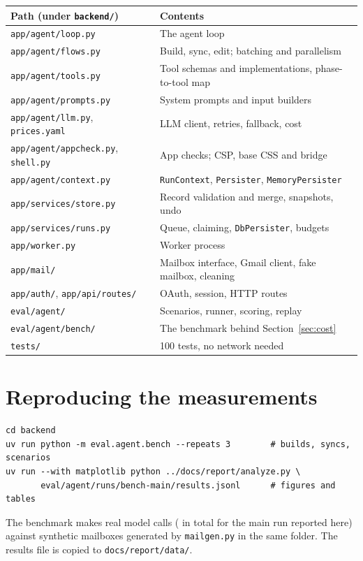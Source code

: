 \documentclass[10pt,a4paper]{article}
\newcommand{\code}[1]{\texttt{\small #1}}
\newcommand{\file}[1]{\texttt{\small #1}}
\begin{document}
\begin{center}\small
\begin{tabularx}{\linewidth}{@{}P{5.6cm}L@{}}
\toprule
\textbf{Path (under \code{backend/})} & \textbf{Contents} \\
\midrule
\file{app/agent/loop.py} & The agent loop \\
\file{app/agent/flows.py} & Build, sync, edit; batching and parallelism \\
\file{app/agent/tools.py} & Tool schemas and implementations, phase-to-tool map \\
\file{app/agent/prompts.py} & System prompts and input builders \\
\file{app/agent/llm.py}, \file{prices.yaml} & LLM client, retries, fallback, cost \\
\file{app/agent/appcheck.py}, \file{shell.py} & App checks; CSP, base CSS and bridge \\
\file{app/agent/context.py} & \code{RunContext}, \code{Persister}, \code{MemoryPersister} \\
\file{app/services/store.py} & Record validation and merge, snapshots, undo \\
\file{app/services/runs.py} & Queue, claiming, \code{DbPersister}, budgets \\
\file{app/worker.py} & Worker process \\
\file{app/mail/} & Mailbox interface, Gmail client, fake mailbox, cleaning \\
\file{app/auth/}, \file{app/api/routes/} & OAuth, session, HTTP routes \\
\file{eval/agent/} & Scenarios, runner, scoring, replay \\
\file{eval/agent/bench/} & The benchmark behind Section~\ref{sec:cost} \\
\file{tests/} & 100 tests, no network needed \\
\bottomrule
\end{tabularx}
\end{center}

\section{Reproducing the measurements}

\begin{verbatim}
cd backend
uv run python -m eval.agent.bench --repeats 3        # builds, syncs, scenarios
uv run --with matplotlib python ../docs/report/analyze.py \
       eval/agent/runs/bench-main/results.jsonl      # figures and tables
\end{verbatim}

The benchmark makes real model calls (\Nbenchcost{} in total for the main run reported here) against synthetic mailboxes generated by \file{mailgen.py} in the same folder. The results
file is copied to \file{docs/report/data/}.
\end{document}
